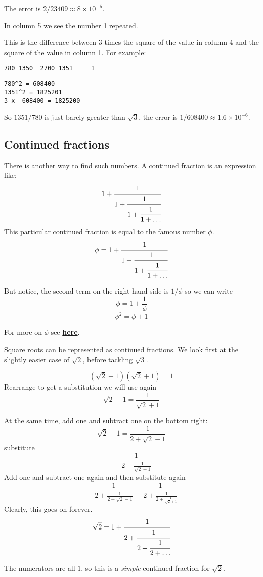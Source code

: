 \documentclass[11pt, oneside]{article}
\begin{document}
The error is $2/23409 \approx 8 \times 10^{-5}$.

In column 5 we see the number 1 repeated.  

This is the difference between 3 times the square of the value in column 4 and the square of the value in column 1.  For example:

\begin{verbatim}
780 1350  2700 1351     1
\end{verbatim}

\begin{verbatim}
780^2 = 608400
1351^2 = 1825201
3 x  608400 = 1825200
\end{verbatim}

So $1351/780$ is just barely greater than $\sqrt{3}$, the error is $1/608400 \approx 1.6 \times 10^{-6}$.

\subsection*{Continued fractions}
There is another way to find such numbers.  A continued fraction is an expression like:
\[ 1 + \cfrac{1}{1 + \cfrac{1}{1 + \cfrac{1}{1 + \dots}}}  \]
This particular continued fraction is equal to the famous number $\phi$. 
\[ \phi = 1 + \cfrac{1}{1 + \cfrac{1}{1 + \cfrac{1}{1 + \dots}}}  \]

But notice, the second term on the right-hand side is $1/\phi$ so we can write
\[ \phi = 1 + \frac{1}{\phi} \]
\[ \phi^2 = \phi + 1 \]

For more on $\phi$ see \hyperref[sec:fibonacci]{\textbf{here}}.

Square roots can be represented as continued fractions.  We look first at the slightly easier case of $\sqrt{2}$, before tackling $\sqrt{3}$.

\[ (\sqrt{2} - 1)(\sqrt{2} + 1) = 1 \]
Rearrange to get a substitution we will use again
\[ \sqrt{2} - 1 = \frac{1}{\sqrt{2} + 1} \]

At the same time, add one and subtract one on the bottom right:
\[ \sqrt{2} - 1 =  \frac{1}{2 + \sqrt{2} - 1} \]
substitute
\[ = \frac{1}{2 + \frac{1}{\sqrt{2} + 1}} \]
Add one and subtract one again and then substitute again
\[ = \frac{1}{2 + \frac{1}{2 + \sqrt{2} - 1}} = \frac{1}{2 + \frac{1}{2 + \frac{1}{\sqrt{2} + 1} }} \]
Clearly, this goes on forever.
\[ \sqrt{2} = 1 + \cfrac{1}{2+\cfrac{1}{2+\cfrac{1}{2 + \dots}}}  \]

The numerators are all $1$, so this is a \emph{simple} continued fraction for $\sqrt{2}$.
\end{document}
